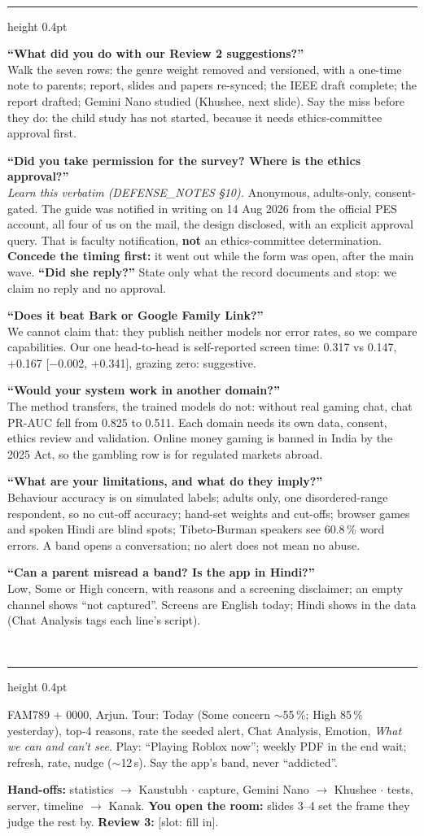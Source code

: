 \documentclass[10pt,a4paper]{article}
\newcommand{\sect}[1]{\vspace{2mm}{\color{teal}\bfseries\small\MakeUppercase{#1}}\\[0.6mm]\hrule height 0.4pt\vspace{1.2mm}}
\newcommand{\qa}[2]{\begin{minipage}{\linewidth}\small\textbf{\color{navy}#1}\\[0.3mm]\color{black!85}#2\end{minipage}\vspace{1.6mm}}
\newcommand{\mn}{\ensuremath{-}}
\begin{document}
\sect{Hardest Review 3 questions}
\qa{``What did you do with our Review 2 suggestions?''}{Walk the seven rows: the genre weight removed and versioned, with a one-time note to parents; report, slides and papers re-synced; the IEEE draft complete; the report drafted; Gemini Nano studied (Khushee, next slide). Say the miss before they do: the child study has not started, because it needs ethics-committee approval first.}
\qa{``Did you take permission for the survey? Where is the ethics approval?''}{\emph{Learn this verbatim (DEFENSE\_NOTES \S10).} Anonymous, adults-only, consent-gated. The guide was notified in writing on 14 Aug 2026 from the official PES account, all four of us on the mail, the design disclosed, with an explicit approval query. That is faculty notification, \textbf{not} an ethics-committee determination. \textbf{Concede the timing first:} it went out while the form was open, after the main wave. \textbf{``Did she reply?''} State only what the record documents and stop: we claim no reply and no approval.}
\qa{``Does it beat Bark or Google Family Link?''}{We cannot claim that: they publish neither models nor error rates, so we compare capabilities. Our one head-to-head is self-reported screen time: 0.317 vs 0.147, +0.167 [\mn0.002, +0.341], grazing zero: suggestive.}
\qa{``Would your system work in another domain?''}{The method transfers, the trained models do not: without real gaming chat, chat PR-AUC fell from 0.825 to 0.511. Each domain needs its own data, consent, ethics review and validation. Online money gaming is banned in India by the 2025 Act, so the gambling row is for regulated markets abroad.}
\qa{``What are your limitations, and what do they imply?''}{Behaviour accuracy is on simulated labels; adults only, one disordered-range respondent, so no cut-off accuracy; hand-set weights and cut-offs; browser games and spoken Hindi are blind spots; Tibeto-Burman speakers see 60.8\,\% word errors. A band opens a conversation; no alert does not mean no abuse.}
\qa{``Can a parent misread a band? Is the app in Hindi?''}{Low, Some or High concern, with reasons and a screening disclaimer; an empty channel shows ``not captured''. Screens are English today; Hindi shows in the data (Chat Analysis tags each line's script).}

\sect{Demo role --- you narrate the ParentApp}
{\small FAM789 + 0000, Arjun. Tour: Today (Some concern $\sim$55\,\%; High 85\,\% yesterday), top-4 reasons, rate the seeded alert, Chat Analysis, Emotion, \emph{What we can and can't see}. Play: ``Playing Roblox now''; weekly PDF in the end wait; refresh, rate, nudge ($\sim$12\,s). Say the app's band, never ``addicted''.\par}

\vfill
{\color{greyt}\footnotesize \textbf{Hand-offs:} statistics $\to$ Kaustubh $\cdot$ capture, Gemini Nano $\to$ Khushee $\cdot$ tests, server, timeline $\to$ Kanak. \textbf{You open the room:} slides 3--4 set the frame they judge the rest by. \textbf{Review 3:} [slot: fill in].\par}
\end{document}
